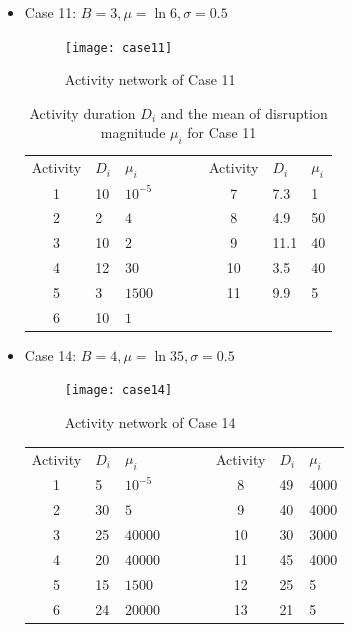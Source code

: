 \documentclass[11pt]{article}
\begin{document}
	\begin{itemize}
		\item Case 11: \(B = 3, \mu = \ln 6, \sigma = 0.5\)
		\begin{figure}[H]
			\centering
			\texttt{[image: case11]}
			\caption{Activity network of Case 11}
			\label{fig:case11}
		\end{figure}
		\begin{table}[H]
			\centering		
			\begin{tabular}{ c | l | l l c| l | l}
				\cline{1-3}\cline{5-7}
				Activity & \(D_{i}\) & \(\mu_i\) & \(\qquad\)& Activity & \(D_{i}\) & \(\mu_i\) \\
				\cline{1-3}\cline{5-7}
				1 & 10 & \(10^{-5}\) & & 7 & 7.3 & 1\\ 
				2 & 2 & \(4\) & & 8 & 4.9 & 50\\ 
				3 & 10 & \(2\) & & 9 & 11.1 & 40\\ 
				4 & 12 & \(30\) & & 10 & 3.5 & 40\\ 
				5 & 3 & \(1500\) & & 11 & 9.9 & 5\\ 
				6 & 10 & \(1\) & &  &  & \\ 
				\cline{1-3}\cline{5-7}
			\end{tabular}
			\caption{Activity duration \(D_i\) and the mean of disruption magnitude \(\mu_i\) for Case 11}
			\label{table:case11}
		\end{table}
		\pagebreak
		\item Case 14: \(B = 4, \mu = \ln 35, \sigma = 0.5\)
		\begin{figure}[H]
			\centering
			\texttt{[image: case14]}
			\caption{Activity network of Case 14}
			\label{fig:case14}
		\end{figure}
		\begin{table}[H]
			\centering		
			\begin{tabular}{ c | l | l l c| l | l}
				\cline{1-3}\cline{5-7}
				Activity & \(D_{i}\) & \(\mu_i\) & \(\qquad\)& Activity & \(D_{i}\) & \(\mu_i\) \\
				\cline{1-3}\cline{5-7}
				1 & 5 & \(10^{-5}\) & & 8 & 49 & 4000\\ 
				2 & 30 & \(5\) & & 9 & 40 & 4000\\ 
				3 & 25 & \(40000\) & & 10 & 30 & 3000\\ 
				4 & 20 & \(40000\) & & 11 & 45 & 4000\\ 
				5 & 15 & \(1500\) & & 12 & 25 & 5\\ 
				6 & 24 & \(20000\) & & 13 & 21 & 5 \\ 

\end{tabular}
\end{table}
\end{itemize}
\end{document}
